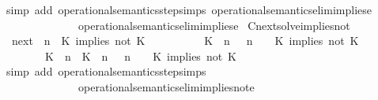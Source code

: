 \begin{isabellebody}
%
\isadelimproof
%
\endisadelimproof
%
\isatagproof
{}\isamarkupfalse%
\ {\isacharparenleft}simp\ add{\isacharcolon}\ operational{\isacharunderscore}semantics{\isacharunderscore}step{\isachardot}simps\ operational{\isacharunderscore}semantics{\isacharunderscore}elim{\isachardot}implies{\isacharunderscore}e{}\isanewline
\ \ \ \ \ \ \ \ \ \ \ \ \ \ operational{\isacharunderscore}semantics{\isacharunderscore}elim{\isachardot}implies{\isacharunderscore}e{}{\isacharparenright}%
\endisatagproof
{\isafoldproof}%
%
\isadelimproof
\isanewline
%
\endisadelimproof
\isanewline
{}\isamarkupfalse%
\ Cnext{\isacharunderscore}solve{\isacharunderscore}implies{\isacharunderscore}not{\isacharcolon}\isanewline
\ \ {\isacartoucheopen}{\isacharparenleft}{\isasymC}\isactrlsub n\isactrlsub e\isactrlsub x\isactrlsub t\ {\isacharparenleft}{\isasymGamma}{\isacharcomma}\ n\ {\isasymturnstile}\ {\isacharparenleft}{\isacharparenleft}K\ implies\ not\ K\ {\isacharhash}\ {\isasymPsi}{\isacharparenright}\ {\isasymtriangleright}\ {\isasymPhi}{\isacharparenright}{\isacharparenright}\isanewline
\ \ \ \ {\isasymsupseteq}\ {\isacharbraceleft}\ {\isacharparenleft}{\isacharparenleft}K\ {\isasymnot}{\isasymUp}\ n{\isacharparenright}\ {\isacharhash}\ {\isasymGamma}{\isacharparenright}{\isacharcomma}\ n\ {\isasymturnstile}\ {\isasymPsi}\ {\isasymtriangleright}\ {\isacharparenleft}{\isacharparenleft}K\ implies\ not\ K\ {\isacharhash}\ {\isasymPhi}{\isacharparenright}{\isacharcomma}\isanewline
\ \ \ \ \ \ \ \ {\isacharparenleft}{\isacharparenleft}K\ {\isasymUp}\ n{\isacharparenright}\ {\isacharhash}\ {\isacharparenleft}K\ {\isasymnot}{\isasymUp}\ n{\isacharparenright}\ {\isacharhash}\ {\isasymGamma}{\isacharparenright}{\isacharcomma}\ n\ {\isasymturnstile}\ {\isasymPsi}\ {\isasymtriangleright}\ {\isacharparenleft}{\isacharparenleft}K\ implies\ not\ K\ {\isacharhash}\ {\isasymPhi}{\isacharparenright}\ {\isacharbraceright}{\isacartoucheclose}\isanewline
%
\isadelimproof
%
\endisadelimproof
%
\isatagproof
{}\isamarkupfalse%
\ {\isacharparenleft}simp\ add{\isacharcolon}\ operational{\isacharunderscore}semantics{\isacharunderscore}step{\isachardot}simps\isanewline
\ \ \ \ \ \ \ \ \ \ \ \ \ \ operational{\isacharunderscore}semantics{\isacharunderscore}elim{\isachardot}implies{\isacharunderscore}not{\isacharunderscore}e{}\isanewline

\end{isabellebody}
